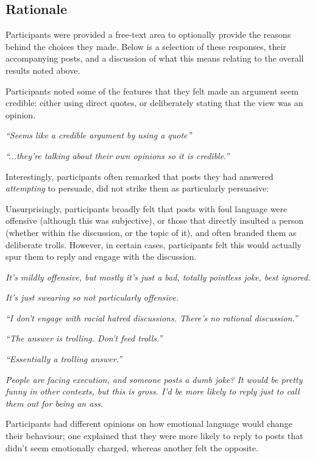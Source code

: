 \subsection{Rationale}
\label{perception:results:rationale}
Participants were provided a free-text area to optionally provide the reasons behind the choices they made. Below is a selection of these responses, their accompanying posts, and a discussion of what this means relating to the overall results noted above.






Participants noted some of the features that they felt made an argument seem credible: either using direct quotes, or deliberately stating that the view was an opinion.

\textit{``Seems like a credible argument by using a quote''}

\textit{``...they're talking about their own opinions so it is credible.''}

Interestingly, participants often remarked that posts they had answered \textit{attempting} to persuade, did not strike them as particularly persuasive:





Unsurprisingly, participants broadly felt that posts with foul language were offensive (although this was subjective), or those that directly insulted a person (whether within the discussion, or the topic of it), and often branded them as deliberate trolls. However, in certain cases, participants felt this would actually spur them to reply and engage with the discussion.

\textit{It's mildly offensive, but mostly it's just a bad, totally pointless joke, best ignored.}

\textit{It's just swearing so not particularly offensive.}

\textit{``I don't engage with racial hatred discussions. There's no rational discussion.''}

\textit{``The answer is trolling. Don't feed trolls.''}

\textit{``Essentially a trolling answer.''}

\textit{People are facing execution, and someone posts a dumb joke? It would be pretty funny in other contexts, but this is gross. I'd be more likely to reply just to call them out for being an ass.}


Participants had different opinions on how emotional language would change their behaviour; one explained that they were more likely to reply to posts that didn't seem emotionally charged, whereas another felt the opposite.

